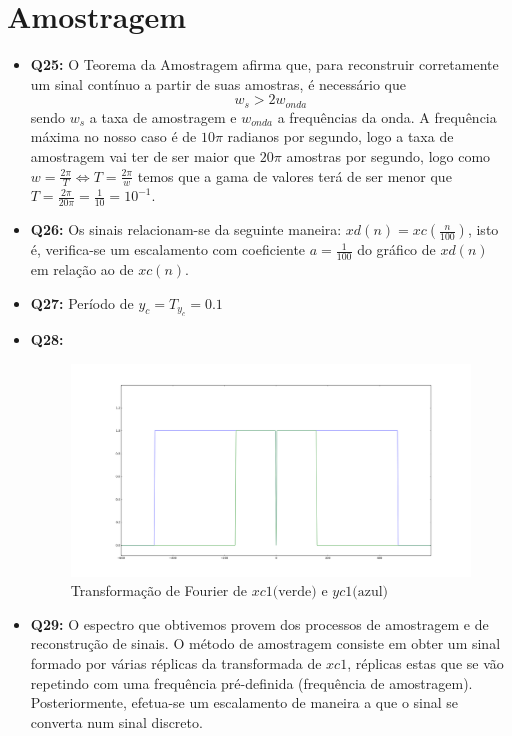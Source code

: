 \documentclass[a4paper, 12pt]{article}
\begin{document}
\section{Amostragem}
\begin{itemize}
    \item \textbf{Q25:} O Teorema da Amostragem afirma que, para reconstruir corretamente um sinal contínuo a partir de suas amostras, é necessário que
          \[w_s > 2w_{onda}\]
          sendo $w_s$ a taxa de amostragem e $w_{onda}$ a frequências da onda.
          A frequência máxima no nosso caso é de $10\pi$ radianos por segundo, logo a taxa de amostragem vai ter de ser maior que $20\pi$ amostras por segundo, logo como $w = \frac{2\pi}{T} \Leftrightarrow T = \frac{2\pi}{w}$ temos que a gama de valores terá de ser menor que $T = \frac{2\pi}{20\pi} = \frac{1}{10} = 10^{-1}$.
    \item \textbf{Q26:} Os sinais relacionam-se da seguinte maneira: $xd(n) = xc\left(\frac{n}{100}\right)$, isto é, verifica-se um escalamento com coeficiente $a = \frac{1}{100}$ do gráfico de $xd(n)$ em relação ao de $xc(n)$.
    \item \textbf{Q27:} Período de $y_{c} = T_{y_c} = 0.1$
    \item \textbf{Q28:}
          \begin{figure}[!ht]
              \includegraphics[width = 13.5cm]{images/Graf6.png}
              \vspace{-15px}
              \caption{Transformação de Fourier de $xc1 \textrm{(verde) e } yc1 \textrm{(azul)}$}
          \end{figure}
          \newpage
    \item \textbf{Q29:} O espectro que obtivemos provem dos processos de amostragem e de reconstrução de sinais. O método de amostragem consiste em obter um sinal formado por várias réplicas da transformada de $xc1$, réplicas estas que se vão repetindo com uma frequência pré-definida (frequência de amostragem). Posteriormente, efetua-se um escalamento de maneira a que o sinal se converta num sinal discreto.\\

\end{itemize}
\end{document}
